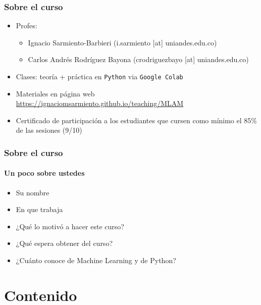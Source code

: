 \documentclass[
  shownotes,
  xcolor={svgnames},
  hyperref={colorlinks,citecolor=DarkBlue,linkcolor=Black,urlcolor=DarkBlue}
  , aspectratio=169]{beamer}
\begin{document}
\begin{frame}
\frametitle{Sobre el curso}

\begin{itemize}
    \item Profes:
      \medskip
    \begin{itemize}
    \item Ignacio Sarmiento-Barbieri (i.sarmiento [at] uniandes.edu.co)
    \medskip
    \item Carlos Andrés Rodríguez Bayona (crodriguezbayo [at] uniandes.edu.co)
    
    \end{itemize}
    \medskip
\item Clases: teoría + práctica en \texttt{Python} via  \texttt{Google Colab} 
\medskip
\item Materiales en página web \url{https://ignaciomsarmiento.github.io/teaching/MLAM}
\medskip

\item Certificado de participación a los estudiantes que cursen como mínimo el 85\% de las sesiones (9/10)

\end{itemize}
\end{frame}
\begin{frame}
\frametitle{Sobre el curso}
\framesubtitle{Un poco sobre ustedes}
\begin{itemize}
    
    
        \item Su nombre
        \medskip
        \item En que trabaja
        \medskip
        \item ¿Qué lo motivó a hacer este curso?
            \medskip
        \item ¿Qué espera obtener del curso?
           \medskip
        \item ¿Cuánto conoce de Machine Learning y de Python?
    
    
    

\end{itemize}

\end{frame}
\section{Contenido}
\end{document}
